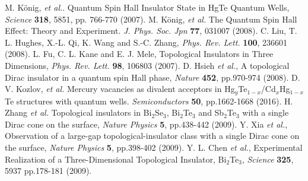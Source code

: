 \documentclass[titlepage,a4paper]{book}
\begin{document}
\begin{thebibliography}{199}
M. König, \textit{et al.}. Quantum Spin Hall Insulator State in HgTe Quantum Wells, \textit{Science} \textbf{318}, 5851, pp. 766-770 (2007).
M. König, \textit{et al.} The Quantum Spin Hall Effect: Theory and Experiment. \textit{J. Phys. Soc. Jpn} \textbf{77}, 031007 (2008).
C. Liu, T. L. Hughes, X.-L. Qi, K. Wang and S.-C. Zhang, \textit{Phys. Rev. Lett.} \textbf{100}, 236601 (2008).
L. Fu, C. L. Kane and E. J. Mele, Topological Insulators in Three Dimensions, \textit{Phys. Rev. Lett.} \textbf{98}, 106803 (2007).
D. Hsieh \textit{et al.}, A topological Dirac insulator in a quantum spin Hall phase, \textit{Nature} \textbf{452}, pp.970-974 (2008).
D. V. Kozlov, \textit{et al.} Mercury vacancies as divalent acceptors in Hg$_y$Te$_{1-x}$/Cd$_x$Hg$_{1-x}$Te structures with quantum wells. \textit{Semiconductors} \textbf{50}, pp.1662-1668 (2016).
H. Zhang \textit{et al.} Topological insulators in Bi$_2$Se$_3$, Bi$_2$Te$_3$ and Sb$_2$Te$_3$ with a single Dirac cone on the surface, \textit{Nature Physics} \textbf{5}, pp.438-442 (2009).
Y. Xia \textit{et al.}, Observation of a large-gap topological-insulator class with a single Dirac cone on the surface, \textit{Nature Physics} \textbf{5}, pp.398-402 (2009).
Y. L. Chen \textit{et al.}, Experimental Realization of a Three-Dimensional Topological Insulator, Bi$_2$Te$_3$,  \textit{Science} \textbf{325}, 5937 pp.178-181 (2009).



\end{thebibliography}
\end{document}
